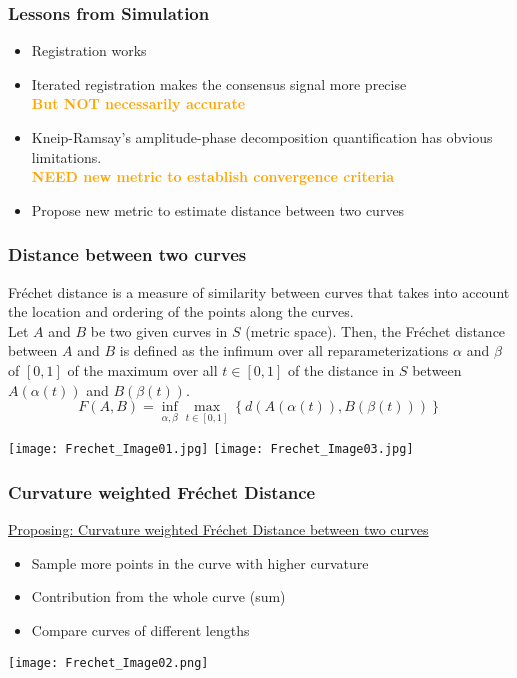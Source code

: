 \documentclass[10pt,dvipsnames,table]{beamer}
\begin{document}
\begin{frame}
\frametitle{Lessons from Simulation}
\begin{itemize}
\pause \item Registration works
\pause \item Iterated registration makes the consensus signal more precise \\
\textcolor{orange}{\bf{But NOT necessarily accurate}}
\pause \item Kneip-Ramsay's amplitude-phase decomposition quantification has obvious limitations. \\
\textcolor{orange}{\bf{NEED new metric to establish convergence criteria}}
\pause \item Propose new metric to estimate distance between two curves
\end{itemize}
\end{frame}

\begin{frame}
\frametitle{Distance between two curves}
Fr\'echet distance is a measure of similarity between curves that takes into account the location and ordering of the points along the curves.\\
Let $A$ and $B$ be two given curves in $S$ (metric space). Then, the Fr\'echet distance between $A$ and $B$ is defined as the infimum over all reparameterizations $\alpha$ and $\beta$ of $[0,1]$ of the maximum over all $t \in [0,1]$ of the distance in $S$ between $A(\alpha(t))$ and $B(\beta(t))$. 
\[ F(A,B) = \inf\limits_{\alpha, \beta} \max\limits_{t \in [0,1]} \left\{ d(A(\alpha(t)), B(\beta(t))) \right\}   \]

\begin{center}
\texttt{[image: Frechet\_Image01.jpg]} 
\texttt{[image: Frechet\_Image03.jpg]} 
\end{center}
\end{frame}

\begin{frame}
\frametitle{Curvature weighted Fr\'echet Distance}
{\underline{Proposing: Curvature weighted Fr\'echet Distance between two curves}}
\begin{itemize} 
\item Sample more points in the curve with higher curvature
\item Contribution from the whole curve (sum)
\item Compare curves of different lengths
\end{itemize} 

\begin{center}
\texttt{[image: Frechet\_Image02.png]} 
\end{center}
\end{frame}
\end{document}

